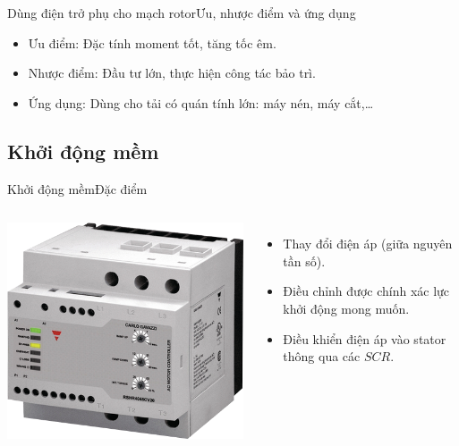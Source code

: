 \documentclass[17pt]{beamer}
\begin{document}
\begin{frame}{Dùng điện trở phụ cho mạch rotor}{Ưu, nhược điểm và ứng dụng}
\begin{itemize}
\item \alert{Ưu điểm}: Đặc tính moment tốt, tăng tốc êm.
\item \alert{Nhược điểm}: Đầu tư lớn, thực hiện công tác bảo trì.
\item \alert{Ứng dụng}: Dùng cho tải có quán tính lớn: máy nén, máy cắt,\ldots
\end{itemize}
\end{frame}

\subsection*{Khởi động mềm}
\begin{frame}{Khởi động mềm}{Đặc điểm}
\begin{columns}
\vspace{-2cm}
\begin{center}
\includegraphics[scale=.25]{images-chude1/khoidongmem.png} 
\end{center}
\begin{itemize}
\item Thay đổi điện áp (giữa nguyên tần số).
\item Điều chỉnh được chính xác lực khởi động mong muốn.
\item Điều khiển điện áp vào stator thông qua các $SCR$.
\end{itemize}
\end{columns}
\end{frame}
\end{document}
